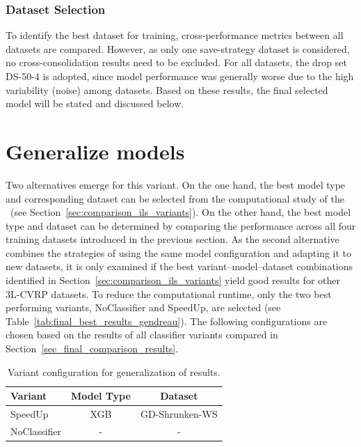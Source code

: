 \subsubsection{Dataset Selection}

To identify the best dataset for training, cross-performance metrics between all datasets are compared. However,
as only one save-strategy dataset is considered, no cross-consolidation results need to be excluded. For all datasets,
the drop set DS-50-4 is adopted, since model performance was generally worse due to the high variability (noise) among datasets.
\parbreak
Based on these results, the final selected model will be stated and discussed below.

\section{Generalize \gendreauDataSetText models}
\label{sec:krebs_data_pretrained_models}

Two alternatives emerge for this variant. On the one hand, the best model type and corresponding dataset can be selected
from the computational study of the \gendreauDataSetText~(see Section~\ref{sec:comparison_ils_variants}). On the other hand, the
best model type and dataset can be determined by comparing the performance across all four \krebsADataSetText training datasets introduced in the previous section.
As the second alternative combines the strategies of using the same model configuration and adapting it to new datasets, it is
only examined if the best variant–model–dataset combinations identified in Section~\ref{sec:comparison_ils_variants} yield good
results for other \gls{3L-CVRP} datasets. To reduce the computational runtime, only the two best performing variants, NoClassifier
and SpeedUp, are selected (see Table~\ref{tab:final_best_results_gendreau}). The following configurations are chosen based
on the results of all classifier variants compared in Section~\ref{sec_final_comparison_results}.

\begin{table}[ht]
    \centering
    \small
    \begin{tabular}{l c c  }
        \toprule
        Variant      & Model Type & Dataset        \\
        \midrule
        SpeedUp      & XGB        & GD-Shrunken-WS \\
        NoClassifier & -          & -              \\
        \bottomrule
    \end{tabular}
    \caption{Variant configuration for generalization of \gendreauDataSetText results.}
    \label{tab:model_configuration_krebs}
\end{table}

